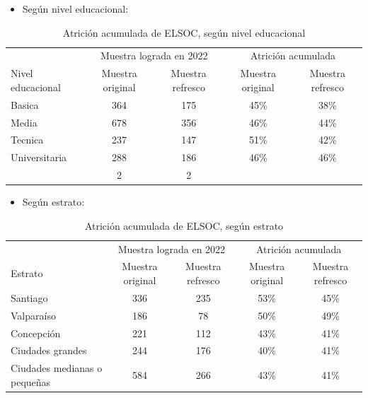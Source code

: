 \documentclass[
  12pt,
]{book}
\providecommand{\tightlist}{%
  \setlength{\itemsep}{0pt}\setlength{\parskip}{0pt}}
\begin{document}
\begin{itemize}
\tightlist
\item
  Según nivel educacional:
\end{itemize}

\begin{table}

\caption{\label{tab:tabla-atricion-educ}Atrición acumulada de ELSOC, según nivel educacional}
\centering
\begin{tabular}[t]{l|c|c|c|c}
\hline
\multicolumn{1}{c|}{ } & \multicolumn{2}{c|}{Muestra lograda en 2022} & \multicolumn{2}{c}{Atrición acumulada} \\
\cline{2-3} \cline{4-5}
Nivel educacional & Muestra original & Muestra refresco & Muestra original & Muestra refresco\\
\hline
Basica & 364 & 175 & 45\% & 38\%\\
\hline
Media & 678 & 356 & 46\% & 44\%\\
\hline
Tecnica & 237 & 147 & 51\% & 42\%\\
\hline
Universitaria & 288 & 186 & 46\% & 46\%\\
\hline
 & 2 & 2 &  & \\
\hline
\end{tabular}
\end{table}

\begin{itemize}
\tightlist
\item
  Según estrato:
\end{itemize}

\begin{table}

\caption{\label{tab:tabla-atricion-estrato}Atrición acumulada de ELSOC, según estrato}
\centering
\begin{tabular}[t]{l|c|c|c|c}
\hline
\multicolumn{1}{c|}{ } & \multicolumn{2}{c|}{Muestra lograda en 2022} & \multicolumn{2}{c}{Atrición acumulada} \\
\cline{2-3} \cline{4-5}
Estrato & Muestra original & Muestra refresco & Muestra original & Muestra refresco\\
\hline
Santiago & 336 & 235 & 53\% & 45\%\\
\hline
Valparaíso & 186 & 78 & 50\% & 49\%\\
\hline
Concepción & 221 & 112 & 43\% & 41\%\\
\hline
Ciudades
grandes & 244 & 176 & 40\% & 41\%\\
\hline
Ciudades medianas
o pequeñas & 584 & 266 & 43\% & 41\%\\
\hline
\end{tabular}
\end{table}
\end{document}
